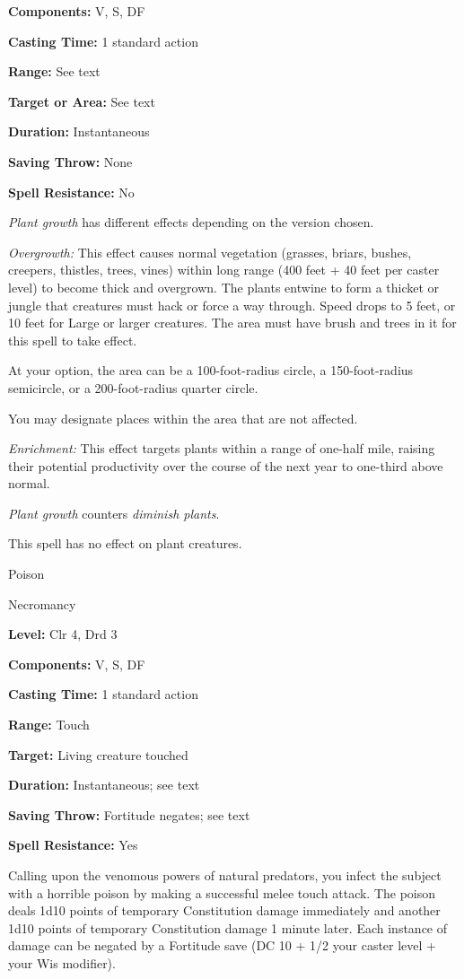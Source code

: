 \documentclass{article}
\begin{document}
\textbf{Components:} V, S, DF

\textbf{Casting Time:} 1 standard action

\textbf{Range:} See text

\textbf{Target or Area:} See text

\textbf{Duration:} Instantaneous

\textbf{Saving Throw:} None

\textbf{Spell Resistance:} No

\textit{Plant growth }has different effects depending on the version chosen.

\textit{Overgrowth: }This effect causes normal vegetation (grasses, briars, bushes, 
creepers, thistles, trees, vines) within long range (400 feet + 40 feet per caster 
level) to become thick and overgrown. The plants entwine to form a thicket or jungle 
that creatures must hack or force a way through. Speed drops to 5 feet, or 10 feet 
for Large or larger creatures. The area must have brush and trees in it for this 
spell to take effect.

At your option, the area can be a 100-foot-radius circle, a 150-foot-radius semicircle, 
or a 200-foot-radius quarter circle.

You may designate places within the area that are not affected.

\textit{Enrichment: }This effect targets plants within a range of one-half mile, 
raising their potential productivity over the course of the next year to one-third 
above normal.

\textit{Plant growth }counters \textit{diminish plants}.

This spell has no effect on plant creatures.

\vspace{12pt}
Poison

Necromancy

\textbf{Level:} Clr 4, Drd 3

\textbf{Components:} V, S, DF

\textbf{Casting Time:} 1 standard action

\textbf{Range:} Touch

\textbf{Target:} Living creature touched

\textbf{Duration:} Instantaneous; see text

\textbf{Saving Throw:} Fortitude negates; see text

\textbf{Spell Resistance:} Yes

Calling upon the venomous powers of natural predators, you infect the subject with 
a horrible poison by making a successful melee touch attack. The poison deals 1d10 
points of temporary Constitution damage immediately and another 1d10 points of 
temporary Constitution damage 1 minute later. Each instance of damage can be negated 
by a Fortitude save (DC 10 + 1/2 your caster level + your Wis modifier).
\end{document}
